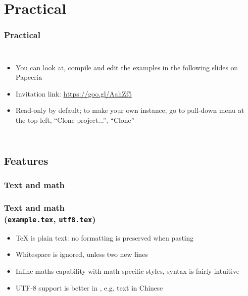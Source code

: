 \documentclass[xetex,colorlinks]{beamer} %
\begin{document}
  \section{Practical}
  \begin{frame}
    \frametitle{Practical}
    \begin{columns}
      \begin{itemize}
      \item You can look at, compile and edit the examples in the following slides on Papeeria
      \item Invitation link: \href{https://www.papeeria.com/join?token_id=f5d56e17-d2a0-4965-b11d-0e608bc28e08&retry=3}{https://goo.gl/AahZf5}
      \item Read-only by default; to make your own instance, go to pull-down menu at the top left, ``Clone project...'', ``Clone''
      \end{itemize}
    \end{columns}
  \end{frame}

  
  \subsection{Features}
  \subsubsection{Text and math}
  \begin{frame}
    \frametitle{Text and math \\ (\texttt{example.tex}, \texttt{utf8.tex})}
    \begin{itemize}
     \item \TeX{} is plain text: no formatting is preserved when pasting
     \item Whitespace is ignored, unless two new lines
     \item Inline maths capability with math-specific styles, syntax is fairly intuitive
     \item UTF-8 support is better in , e.g. text in Chinese
    \end{itemize}
  \end{frame}
  
\end{document}
